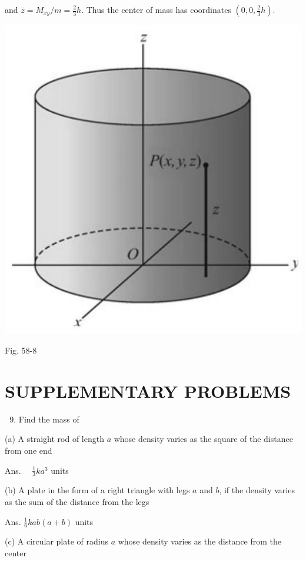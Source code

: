 \documentclass[10pt]{article}
\begin{document}
and $\bar{z}=M_{x y} / m=\frac{2}{3} h$. Thus the center of mass has coordinates $\left(0,0, \frac{2}{3} h\right)$.

\begin{center}
\includegraphics[max width=\textwidth]{2024_04_20_fe2e8e718cc0fcd63d1bg-15(1)}
\end{center}

Fig. 58-8

\section*{SUPPLEMENTARY PROBLEMS}
\begin{enumerate}
  \setcounter{enumi}{8}
  \item Find the mass of
\end{enumerate}

(a) A straight rod of length $a$ whose density varies as the square of the distance from one end

Ans. $\quad \frac{1}{3} k a^{3}$ units

(b) A plate in the form of a right triangle with legs $a$ and $b$, if the density varies as the sum of the distance from the legs

Ans. $\frac{1}{6} k a b(a+b)$ units

(c) A circular plate of radius $a$ whose density varies as the distance from the center
\end{document}
